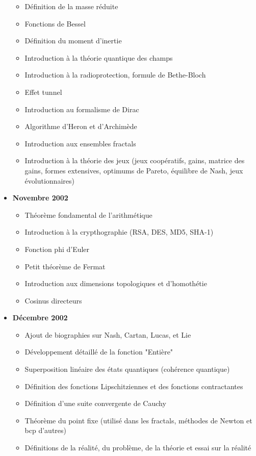 \documentclass[12pt,a4paper,twoside,openright]{report}
\theoremstyle{definition}
\theoremstyle{itexmp}
\numberwithin{equation}{section}
\begin{document}
\begin{itemize}
\begin{itemize}[noitemsep]
				\item Définition de la masse réduite
				\item Fonctions de Bessel
				\item Définition du moment d'inertie
				\item Introduction à la théorie quantique des champs
				\item Introduction à la radioprotection, formule de Bethe-Bloch
				\item Effet tunnel
				\item Introduction au formalisme de Dirac
				\item Algorithme d'Heron et d'Archimède
				\item Introduction aux ensembles fractals
				\item Introduction à la théorie des jeux (jeux coopératifs, gains, matrice des gains, formes extensives, optimums de Pareto, équilibre de Nash, jeux évolutionnaires)
			\end{itemize}
			\item \textbf{Novembre 2002}
				\begin{itemize}[noitemsep]
				\item Théorème fondamental de l'arithmétique
				\item Introduction à la crypthographie (RSA, DES, MD5, SHA-1)
				\item Fonction phi d'Euler
				\item Petit théorème de Fermat
				\item Introduction aux dimensions topologiques et d'homothétie
				\item Cosinus directeurs
			\end{itemize}
			\item \textbf{Décembre 2002}
				\begin{itemize}[noitemsep]
				\item Ajout de biographies sur Nash, Cartan, Lucas, et Lie
				\item Développement détaillé de la fonction "Entière"
				\item Superposition linéaire des états quantiques (cohérence quantique)
				\item Définition des fonctions Lipschitziennes et des fonctions contractantes
				\item Définition d'une suite convergente de Cauchy
				\item Théorème du point fixe (utilisé dans les fractals, méthodes de Newton et bcp d'autres)
				\item Définitions de la réalité, du problème, de la théorie et essai sur la réalité

\end{itemize}
\end{itemize}
\end{document}
